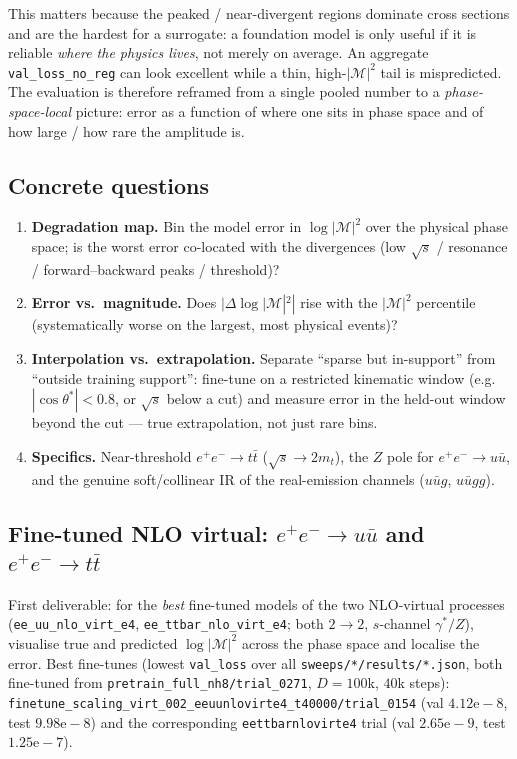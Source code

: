 This matters because the peaked / near-divergent regions dominate cross sections and
are the hardest for a surrogate: a foundation model is only useful if it is reliable
\emph{where the physics lives}, not merely on average.  An aggregate
\texttt{val\_loss\_no\_reg} can look excellent while a thin, high-$|\mathcal{M}|^2$
tail is mispredicted.  The evaluation is therefore reframed from a single pooled
number to a \emph{phase-space-local} picture: error as a function of where one sits in
phase space and of how large / how rare the amplitude is.

\subsection{Concrete questions}
\begin{enumerate}
  \item \textbf{Degradation map.} Bin the model error in $\log|\mathcal{M}|^2$ over
    the physical phase space; is the worst error co-located with the divergences
    (low $\sqrt{s}$ / resonance / forward--backward peaks / threshold)?
  \item \textbf{Error vs.\ magnitude.} Does $|\Delta\log|\mathcal{M}|^2|$ rise with the
    $|\mathcal{M}|^2$ percentile (systematically worse on the largest, most physical
    events)?
  \item \textbf{Interpolation vs.\ extrapolation.} Separate ``sparse but in-support''
    from ``outside training support'': fine-tune on a restricted kinematic window
    (e.g.\ $|\cos\theta^*|<0.8$, or $\sqrt{s}$ below a cut) and measure error in the
    held-out window beyond the cut --- true extrapolation, not just rare bins.
  \item \textbf{Specifics.} Near-threshold $e^+e^-\to t\bar t$ ($\sqrt{s}\to 2m_t$),
    the $Z$ pole for $e^+e^-\to u\bar u$, and the genuine soft/collinear IR of the
    real-emission channels ($u\bar u g$, $u\bar u gg$).
\end{enumerate}

\subsection{Fine-tuned NLO virtual: $e^+e^-\to u\bar u$ and $e^+e^-\to t\bar t$}

First deliverable: for the \emph{best} fine-tuned models of the two NLO-virtual
processes (\texttt{ee\_uu\_nlo\_virt\_e4}, \texttt{ee\_ttbar\_nlo\_virt\_e4}; both
$2\to2$, $s$-channel $\gamma^*/Z$), visualise true and predicted
$\log|\mathcal{M}|^2$ across the phase space and localise the error.  Best fine-tunes
(lowest \texttt{val\_loss} over all \texttt{sweeps/*/results/*.json}, both fine-tuned
from \texttt{pretrain\_full\_nh8/trial\_0271}, $D=100$k, $40$k steps):
\texttt{finetune\_scaling\_virt\_002\_eeuunlovirte4\_t40000/trial\_0154} (val
$4.12\mathrm{e}{-}8$, test $9.98\mathrm{e}{-}8$) and the corresponding
\texttt{eettbarnlovirte4} trial (val $2.65\mathrm{e}{-}9$, test $1.25\mathrm{e}{-}7$).

